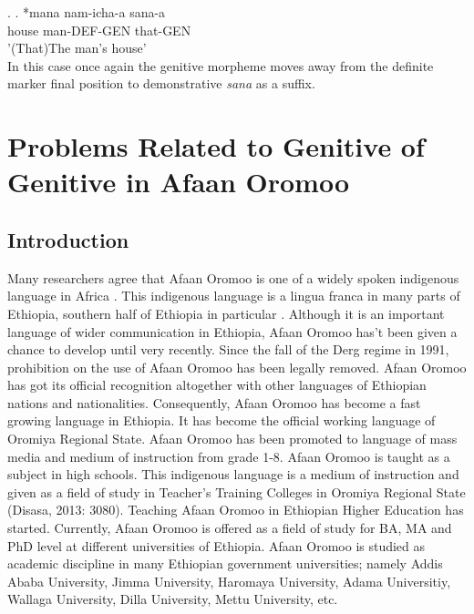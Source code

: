 \documentclass[11pt,a4paper]{article}
\begin{document}
	\ex.
	\ag.
	*mana nam-icha-a sana-a\\
	house man-DEF-GEN that-GEN\\
	'(That)The man's house'\\ 
	
	In this case once again the genitive morpheme moves away from the definite marker final position to demonstrative \emph{sana} as a suffix. 
	
	
	
	
	



	
	\section{Problems Related to Genitive of Genitive in Afaan Oromoo}

\subsection{Introduction}

Many researchers agree that Afaan Oromoo is one of a widely spoken indigenous language in Africa \cite{bulcha1997politics}. This indigenous language is a lingua franca in many parts of Ethiopia, southern half of Ethiopia in particular \cite[326]{bulcha1997politics}. Although it is an important language of wider communication in Ethiopia, Afaan Oromoo has’t been given a chance to develop until very recently. Since the fall of the Derg regime in 1991, prohibition on the use of Afaan Oromoo has been legally removed. Afaan Oromoo has got its official recognition altogether with other languages of Ethiopian nations and nationalities.  Consequently, Afaan Oromoo has become a fast growing language in Ethiopia. It has become the official working language of Oromiya Regional State. Afaan Oromoo has been 
promoted to language of mass media and medium of instruction from grade 1-8. Afaan Oromoo is taught as a subject in high schools. This indigenous language is a medium of instruction and given as a field of study in Teacher’s Training Colleges in Oromiya Regional State (Disasa, 2013: 3080). Teaching Afaan 
Oromoo in Ethiopian Higher Education has started. Currently, Afaan Oromoo is offered as a field of study for BA, MA and PhD level at different universities of Ethiopia. Afaan Oromoo is studied as academic discipline in many Ethiopian government universities; namely Addis Ababa University, 
Jimma University, Haromaya University, Adama Universitiy, Wallaga University, Dilla University, Mettu University, etc. 
\end{document}
